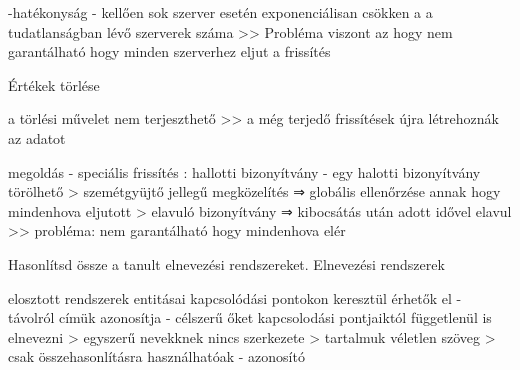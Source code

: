\documentclass[12pt]{article}
\begin{document}
\begin{description}
                                                                        -hatékonyság
                                                                        - kellően sok szerver esetén exponenciálisan csökken a a tudatlanságban lévő szerverek száma
                                                                        >> Probléma viszont az hogy nem garantálható hogy minden szerverhez eljut a frissítés 
                                                                    \item Értékek törlése
                                                                    \item a törlési művelet nem terjeszthető
                                                                        >> a még terjedő frissítések újra létrehoznák az adatot
                                                                    \item megoldás
                                                                        - speciális frissítés : hallotti bizonyítvány
                                                                        - egy halotti bizonyítvány törölhető
                                                                        > szemétgyüjtő jellegű megközelítés ⇒ globális ellenőrzése annak hogy mindenhova eljutott
                                                                        > elavuló bizonyítvány ⇒ kibocsátás után adott idővel elavul >> probléma: nem garantálható hogy mindenhova elér
                                                                    \item  Hasonlítsd össze a tanult elnevezési rendszereket.
                                                                        Elnevezési rendszerek
                                                                    \item elosztott rendszerek entitásai kapcsolódási pontokon keresztül érhetők el
                                                                        - távolról címük azonosítja
                                                                        - célszerű őket kapcsolodási pontjaiktól függetlenül is elnevezni
                                                                        > egyszerű nevekknek nincs szerkezete
                                                                        > tartalmuk véletlen szöveg
                                                                        > csak összehasonlításra használhatóak
                                                                        - azonosító

\end{description}
\end{document}
